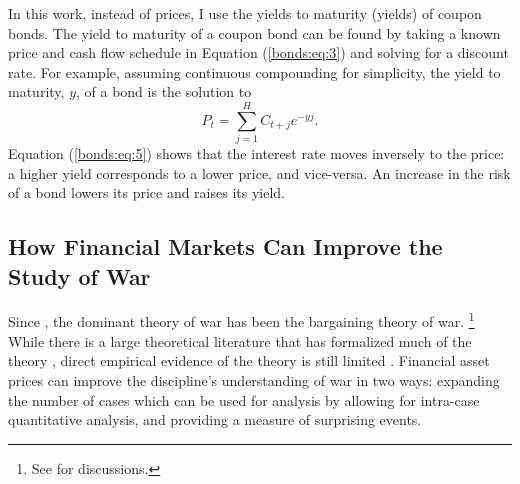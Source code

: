 In this work, instead of prices, I use the yields to maturity (yields) of coupon bonds.
The yield to maturity of a coupon bond can be found by taking a known price and cash flow schedule in Equation (\ref{bonds:eq:3}) and solving for a discount rate.
For example, assuming continuous compounding for simplicity, the yield to maturity, $y$, of a bond is the solution to
\begin{equation}
  \label{bonds:eq:5}
  P_{t} = \sum_{j = 1}^{H} C_{t + j} e^{-y j} \text{.}
\end{equation}
Equation (\ref{bonds:eq:5}) shows that the interest rate moves inversely to the price: a higher yield corresponds to a lower price, and vice-versa.
An increase in the risk of a bond lowers its price and raises its yield.




\subsection{How Financial Markets Can Improve the Study of War}
\label{sec:how-prices-financial-1}

Since \textcite{Fearon1995}, the dominant theory of war has been the bargaining theory of war.%
\footnote{See \textcites{Reiter2003}{Powell2006}{Reiter2009} for discussions.}
While there is a large theoretical literature that has formalized much of the theory \parencites{FilsonWerner2002}{Slantchev2003}{SmithStam2004}{Powell2004}{LeventogluSlantchev2007}{LangloisLanglois2009}{WolfordReiterCarrubba2011}, direct empirical evidence of the theory is still limited \parencite{Reiter2009}.
Financial asset prices can improve the discipline's understanding of war in two ways: expanding the number of cases which can be used for analysis by allowing for intra-case quantitative analysis, and providing a measure of surprising events.

